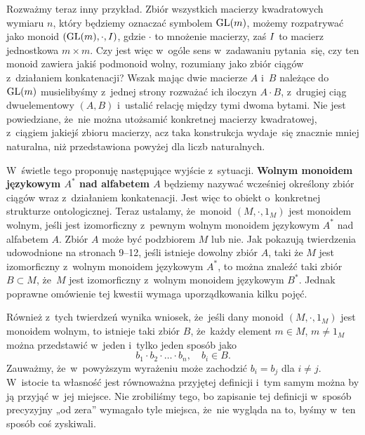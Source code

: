 \documentclass[a4paper,11pt]{article}
\begin{document}
Rozważmy teraz inny przykład. Zbiór wszystkich macierzy kwadratowych wymiaru
$n$, który będziemy oznaczać symbolem $\mathrm{GL}( m )$, możemy rozpatrywać jako
monoid $( \mathrm{GL}( m ), \cdot, I )$, gdzie $\cdot$ to mnożenie macierzy, zaś
$I$ to macierz jednostkowa $m \times m$. Czy jest więc w~ogóle sens
w~zadawaniu pytania~się, czy ten monoid zawiera jakiś podmonoid wolny,
rozumiany jako zbiór ciągów z~działaniem konkatenacji? Wszak mając dwie
macierze $A$ i~$B$ należące do $\mathrm{GL}( m )$ musielibyśmy z~jednej strony
rozważać ich iloczyn $A \cdot B$, z~drugiej ciąg dwuelementowy $( A, B )$
i~ustalić relację między tymi dwoma bytami. Nie jest powiedziane, że~nie
można utożsamić konkretnej macierzy kwadratowej, z~ciągiem jakiejś zbioru
macierzy, acz taka konstrukcja wydaje~się znacznie mniej naturalna, niż
przedstawiona powyżej dla liczb naturalnych.

W~świetle tego proponuję następujące wyjście z~sytuacji. \textbf{Wolnym
  monoidem językowym $A^{ * }$ nad alfabetem $A$} będziemy nazywać wcześniej
określony zbiór ciągów wraz z~działaniem konkatenacji. Jest więc to obiekt
o~konkretnej strukturze ontologicznej. Teraz ustalamy, że~monoid
$( M, \cdot, 1_{ M } )$ jest monoidem wolnym, jeśli jest izomorficzny z~pewnym
wolnym monoidem językowym $A^{ * }$ nad alfabetem $A$. Zbiór $A$ może być
podzbiorem $M$ lub nie. Jak pokazują twierdzenia udowodnione na stronach
9--12, jeśli istnieje dowolny zbiór $A$, taki że $M$ jest izomorficzny
z~wolnym monoidem językowym $A^{ * }$, to można znaleźć taki zbiór $B \subset M$,
że~$M$ jest izomorficzny z~wolnym monoidem językowym $B^{ * }$. Jednak
poprawne omówienie tej kwestii wymaga uporządkowania kilku pojęć.

Również z~tych twierdzeń wynika wniosek, że~jeśli dany monoid
$( M, \cdot, 1_{ M } )$ jest monoidem wolnym, to istnieje taki zbiór $B$,
że~każdy element $m \in M$, $m \neq 1_{ M }$ można przedstawić w~jeden i~tylko
jeden sposób jako
\begin{equation}
  \label{eq:Forys-Forys-04}
  b_{ 1 } \cdot b_{ 2 } \cdot \ldots \cdot b_{ n }, \quad
  b_{ i } \in B.
\end{equation}
Zauważmy, że~w~powyższym wyrażeniu może zachodzić $b_{ i } = b_{ j }$ dla
$i \neq j$. W~istocie ta własność jest równoważna przyjętej definicji i~tym
samym można by ją przyjąć w~jej miejsce. Nie zrobiliśmy tego, bo zapisanie
tej definicji w~sposób precyzyjny „od zera” wymagało tyle miejsca, że~nie
wygląda na to, byśmy w~ten sposób coś zyskiwali.

\vspace{\spaceFour}
\end{document}
